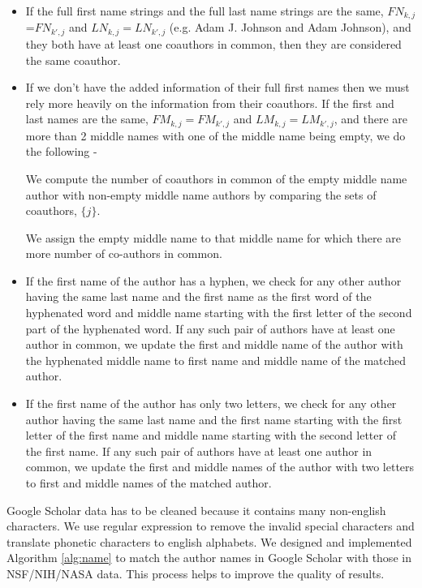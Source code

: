  \begin{itemize}
 \item If the full first name strings and the full last name strings are the same, $FN_{k,j}$=$FN_{k',j}$ and $LN_{k,j} = LN_{k',j}$ (e.g. Adam J. Johnson and Adam Johnson), and they both have at least one coauthors in common,  then they are considered the same coauthor.
 \item If we don't have the added information of their full first names then we must rely more heavily on the information from their coauthors. If the first and last names are the same, $FM_{k,j}=FM_{k',j}$ and $LM_{k,j}=LM_{k',j}$, and there are more than 2 middle names with one of the middle name being empty, we do the following -

 We compute the number of coauthors in common of the empty middle name author with non-empty middle name authors by comparing the sets of coauthors, $\{j\}$.%

 We assign the empty middle name to that middle name for which there are more number of co-authors in common.

 \item If the first name of the author has a hyphen, we check for any other author having the same last name and the first name as the first word of the hyphenated word and middle name starting with the first letter of the second part of the hyphenated word. If any such pair of authors have at least one author in common, we update the first and middle name of the author with the hyphenated middle name to first name and middle name of the matched author.


\item If the first name of the author has only two letters, we check for any other author having the same last name and the first name starting with the first letter of the first name and middle name starting with the second letter of the first name. If any such pair of authors have at least one author in common, we update the first and middle names of the author with two letters to first and middle names of the matched author.

\end{itemize}
Google Scholar data has to be cleaned because it contains many non-english characters. We use regular expression to remove the invalid special characters and translate phonetic characters to english alphabets. We designed and implemented Algorithm \ref{alg:name} to match the author names in Google Scholar with those in NSF/NIH/NASA data. This process helps to improve the quality of results.







